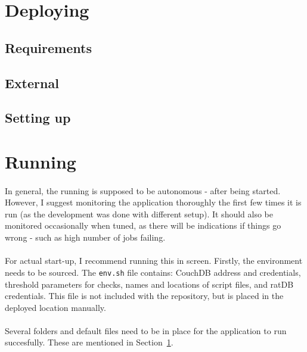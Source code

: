 \documentclass[12pt]{article}
\begin{document}
\clearpage

\section{Deploying}\label{sec:dep}

\subsection{Requirements}

\subsection{External}

\subsection{Setting up}

\section{Running}\label{sec:run}
\paragraph{}
In general, the running is supposed to be autonomous - after being started. However, I suggest monitoring the application thoroughly the first few times it is run (as the development was done with different setup). It should also be monitored occasionally when tuned, as there will be indications if things go wrong - such as high number of jobs failing. 

\paragraph{}
For actual start-up, I recommend running this in screen. Firstly, the environment needs to be sourced. The \texttt{env.sh} file contains: CouchDB address and credentials, threshold parameters for checks, names and locations of script files, and ratDB credentials. This file is not included with the repository, but is placed in the deployed location manually.

\paragraph{}
Several folders and default files need to be in place for the application to run succesfully. These are mentioned in Section~\ref{sec:dep}.
\end{document}

